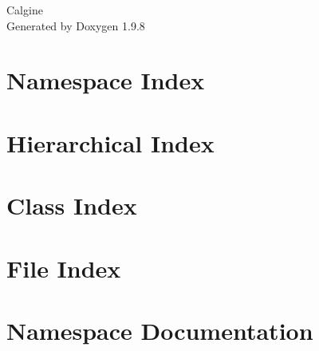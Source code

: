 \documentclass[twoside]{book}
\newcommand{\+}{\discretionary{\mbox{\scriptsize$\hookleftarrow$}}{}{}}
\newcommand{\clearemptydoublepage}{%
    \newpage{\pagestyle{empty}\cleardoublepage}%
  }
\begin{document}
  \raggedbottom
    \hypersetup{pageanchor=false,
                bookmarksnumbered=true,
                pdfencoding=unicode
               }
  \begin{titlepage}
  \vspace*{7cm}
  \begin{center}%
  {\Large Calgine}\\
  \vspace*{1cm}
  {\large Generated by Doxygen 1.9.8}\\
  \end{center}
  \end{titlepage}
  \clearemptydoublepage
  \tableofcontents
  \clearemptydoublepage
  \hypersetup{pageanchor=true}
\chapter{Namespace Index}

\chapter{Hierarchical Index}

\chapter{Class Index}

\chapter{File Index}

\chapter{Namespace Documentation}



\end{document}
